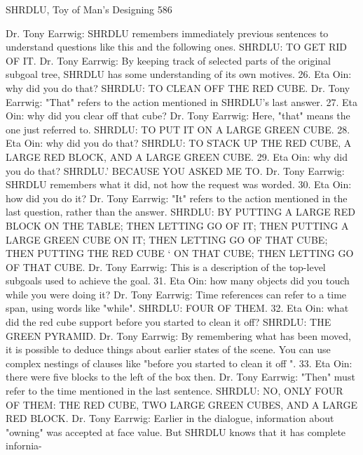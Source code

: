 {SHRDLU, Toy of Man's Designing                                                       586

        Dr. Tony Earrwig: SHRDLU remembers immediately previous sentences to
        understand questions like this and the following ones.
        SHRDLU: TO GET RID OF IT.
        Dr. Tony Earrwig: By keeping track of selected parts of the original subgoal tree,
        SHRDLU has some understanding of its own motives.
26. Eta Oin: why did you do that?
        SHRDLU: TO CLEAN OFF THE RED CUBE.
        Dr. Tony Earrwig: "That" refers to the action mentioned in SHRDLU's last
        answer.
27. Eta Oin: why did you clear off that cube?
        Dr. Tony Earrwig: Here, "that" means the one just referred to. SHRDLU: TO
        PUT IT ON A LARGE GREEN CUBE.
28. Eta Oin: why did you do that?
        SHRDLU: TO STACK UP THE RED CUBE, A LARGE RED BLOCK, AND A
        LARGE GREEN CUBE.
29. Eta Oin: why did you do that?
        SHRDLU.' BECAUSE YOU ASKED ME TO.
        Dr. Tony Earrwig: SHRDLU remembers what it did, not how the request was
        worded.
30. Eta Oin: how did you do it?
        Dr. Tony Earrwig: "It" refers to the action mentioned in the last question,
        rather than the answer.
        SHRDLU: BY PUTTING A LARGE RED BLOCK ON THE TABLE; THEN
        LETTING GO OF IT; THEN PUTTING A LARGE GREEN CUBE ON IT;
        THEN LETTING GO OF THAT CUBE; THEN PUTTING THE RED CUBE
‘       ON THAT CUBE; THEN LETTING GO OF THAT CUBE.
        Dr. Tony Earrwig: This is a description of the top-level subgoals used to
        achieve the goal.
31. Eta Oin: how many objects did you touch while you were doing it?
        Dr. Tony Earrwig: Time references can refer to a time span, using words like
        "while".
        SHRDLU: FOUR OF THEM.
32. Eta Oin: what did the red cube support before you started to clean it off?
        SHRDLU: THE GREEN PYRAMID.
        Dr. Tony Earrwig: By remembering what has been moved, it is possible to
        deduce things about earlier states of the scene. You can use complex nestings
        of clauses like "before you started to clean it off ".
33. Eta Oin: there were five blocks to the left of the box then.
        Dr. Tony Earrwig: "Then" must refer to the time mentioned in the last sentence.
        SHRDLU: NO, ONLY FOUR OF THEM: THE RED CUBE, TWO LARGE
        GREEN CUBES, AND A LARGE RED BLOCK.
        Dr. Tony Earrwig: Earlier in the dialogue, information about "owning" was
        accepted at face value. But SHRDLU knows that it has complete infornia-




}
